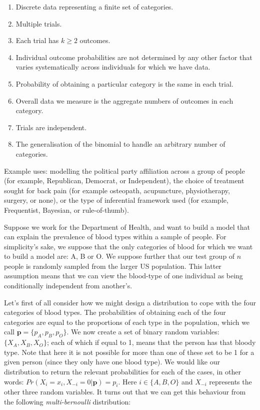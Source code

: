 \documentclass[11pt,fullpage]{book}
\begin{document}
\begin{enumerate} 
\item Discrete data representing a finite set of categories.
\item Multiple trials.
\item Each trial has $k\geq 2$ outcomes.
\item Individual outcome probabilities are not determined by any other factor that varies systematically across individuals for which we have data.
\item Probability of obtaining a particular category is the same in each trial.
\item Overall data we measure is the aggregate numbers of outcomes in each category.
\item Trials are independent.
\item The generalisation of the binomial to handle an arbitrary number of categories.
\end{enumerate}

Example uses: modelling the political party affiliation across a group of people (for example, Republican, Democrat, or Independent), the choice of treatment sought for back pain (for example osteopath, acupuncture, physiotherapy, surgery, or none), or the type of inferential framework used (for example, Frequentist, Bayesian, or rule-of-thumb).

Suppose we work for the Department of Health, and want to build a model that can explain the prevalence of blood types within a sample of people. For simplicity's sake, we suppose that the only categories of blood for which we want to build a model are: A, B or O. We suppose further that our test group of $n$ people is randomly sampled from the larger US population. This latter assumption means that we can view the blood-type of one individual as being conditionally independent from another's. 

Let's first of all consider how we might design a distribution to cope with the four categories of blood types. The probabilities of obtaining each of the four categories are equal to the proportions of each type in the population, which we call $\boldsymbol{p}=\{p_A,p_B,p_O\}$. We now create a set of binary random variables: $\{X_A,X_B,X_O\}$; each of which if equal to 1, means that the person has that bloody type. Note that here it is not possible for more than one of these set to be 1 for a given person (since they only have one blood type). We would like our distribution to return the relevant probabilities for each of the cases, in other words: $Pr(X_i=x_i,X_{-i}=0|\boldsymbol{p}) = p_i$. Here $i\in\{A,B,O\}$ and $X_{-i}$ represents the other three random variables. It turns out that we can get this behaviour from the following \textit{multi-bernoulli} distribution:
\end{document}
